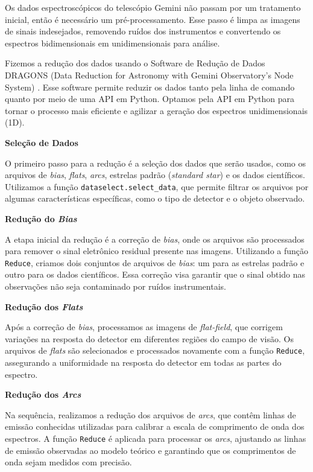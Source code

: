 Os dados espectroscópicos do telescópio Gemini não passam por um tratamento inicial, então é necessário um pré-processamento. Esse passo é limpa as imagens de sinais indesejados, removendo ruídos dos instrumentos e convertendo os espectros bidimensionais em unidimensionais para análise.

Fizemos a redução dos dados usando o Software de Redução de Dados DRAGONS (Data Reduction for Astronomy with Gemini Observatory's Node System) \cite{dragons_python}. Esse software permite reduzir os dados tanto pela linha de comando quanto por meio de uma API em Python. Optamos pela API em Python para tornar o processo mais eficiente e agilizar a geração dos espectros unidimensionais (1D).

\textbf{Seleção de Dados}

O primeiro passo para a redução é a seleção dos dados que serão usados, como os arquivos de \textit{bias}, \textit{flats}, \textit{arcs}, estrelas padrão (\textit{standard star}) e os dados científicos. Utilizamos a função \verb|dataselect.select_data|, que permite filtrar os arquivos por algumas características específicas, como o tipo de detector e o objeto observado.

\textbf{Redução do \textit{Bias}}

A etapa inicial da redução é a correção de \textit{bias}, onde os arquivos são processados para remover o sinal eletrônico residual presente nas imagens. Utilizando a função \verb|Reduce|, criamos dois conjuntos de arquivos de \textit{bias}: um para as estrelas padrão e outro para os dados científicos. Essa correção visa garantir que o sinal obtido nas observações não seja contaminado por ruídos instrumentais.

\textbf{Redução dos \textit{Flats}}

Após a correção de \textit{bias}, processamos as imagens de \textit{flat-field}, que corrigem variações na resposta do detector em diferentes regiões do campo de visão. Os arquivos de \textit{flats} são selecionados e processados novamente com a função \verb|Reduce|, assegurando a uniformidade na resposta do detector em todas as partes do espectro.

\textbf{Redução dos \textit{Arcs}}

Na sequência, realizamos a redução dos arquivos de \textit{arcs}, que contêm linhas de emissão conhecidas utilizadas para calibrar a escala de comprimento de onda dos espectros. A função \verb|Reduce| é aplicada para processar os \textit{arcs}, ajustando as linhas de emissão observadas ao modelo teórico e garantindo que os comprimentos de onda sejam medidos com precisão.

